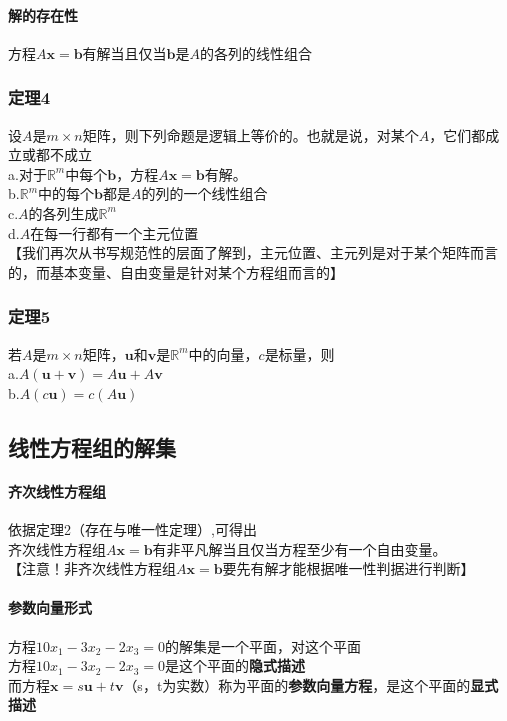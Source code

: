 \documentclass{article}
\newcommand{\ve}{\boldsymbol}
\begin{document}
\begin{CJK}{UTF8}{gkai}
\paragraph{解的存在性\\}
方程$A\ve{x}=\ve{b}$有解当且仅当$\ve{b}$是$A$的各列的线性组合\\


\subsubsection{定理4}
设$A$是$m\times n$矩阵，则下列命题是逻辑上等价的。也就是说，对某个$A$，它们都成立或都不成立\\
a.对于$\mathbb{R}^m$中每个$\ve{b}$，方程$A\ve{x}=\ve{b}$有解。\\
b.$\mathbb{R}^m$中的每个$\ve{b}$都是$A$的列的一个线性组合\\
c.$A$的各列生成$\mathbb{R}^m$\\
d.$A$在每一行都有一个主元位置\\
【我们再次从书写规范性的层面了解到，主元位置、主元列是对于某个矩阵而言的，而基本变量、自由变量是针对某个方程组而言的】\\

\subsubsection{定理5}
若$A$是$m\times n$矩阵，$\ve{u}$和$\ve{v}$是$\mathbb{R}^m$中的向量，$c$是标量，则\\
a.$A(\ve{u}+\ve{v})=A\ve{u}+A\ve{v}$\\
b.$A(c\ve{u})=c(A\ve{u})$\\

\subsection{线性方程组的解集}
\paragraph{齐次线性方程组\\}
依据定理2（存在与唯一性定理）,可得出\\
齐次线性方程组$A\ve{x}=\ve{b}$有非平凡解当且仅当方程至少有一个自由变量。\\
【注意！非齐次线性方程组$A\ve{x}=\ve{b}$要先有解才能根据唯一性判据进行判断】\\

\paragraph{参数向量形式\\}
方程$10x_1-3x_2-2x_3=0$的解集是一个平面，对这个平面\\
方程$10x_1-3x_2-2x_3=0$是这个平面的\textbf{隐式描述}\\
而方程$\ve{x}=s\ve{u}+t\ve{v}$（s，t为实数）称为平面的\textbf{参数向量方程}，是这个平面的\textbf{显式描述}\\


\end{CJK}
\end{document}
